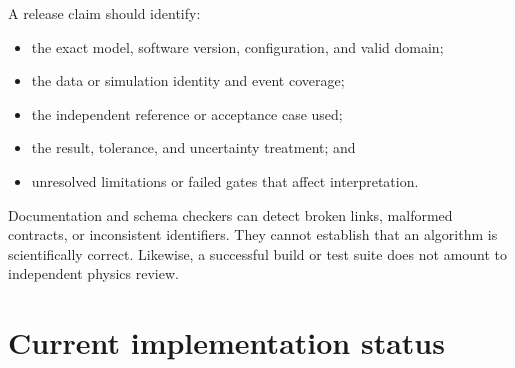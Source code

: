 \documentclass[11pt,a4paper]{article}
\begin{document}
A release claim should identify:
\begin{itemize}
  \item the exact model, software version, configuration, and valid domain;
  \item the data or simulation identity and event coverage;
  \item the independent reference or acceptance case used;
  \item the result, tolerance, and uncertainty treatment; and
  \item unresolved limitations or failed gates that affect interpretation.
\end{itemize}

Documentation and schema checkers can detect broken links, malformed
contracts, or inconsistent identifiers. They cannot establish that an
algorithm is scientifically correct. Likewise, a successful build or test suite
does not amount to independent physics review.

\section{Current implementation status}
\end{document}
